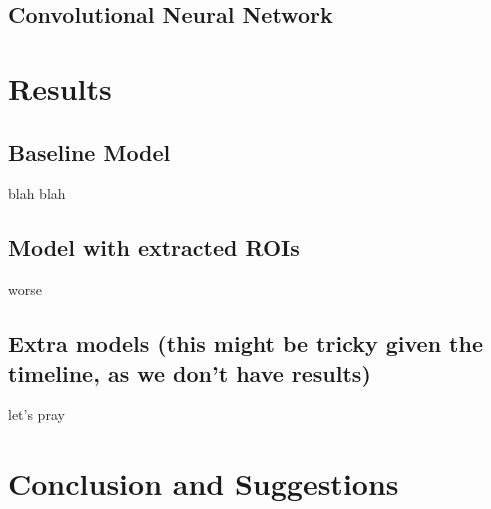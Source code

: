 \documentclass[conference]{IEEEtran}
\begin{document}
\subsection{Convolutional Neural Network}

\section{Results}
\subsection{Baseline Model}
blah blah
\subsection{Model with extracted ROIs}
worse 
\subsection{Extra models (this might be tricky given the timeline, as we don't have results)}
let's pray
\section{Conclusion and Suggestions}
\end{document}
